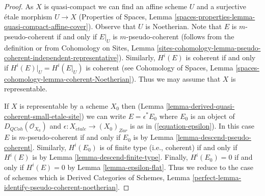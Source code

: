 \documentclass[10pt,a4paper]{amsart}
\theoremstyle{plain}
\theoremstyle{definition}
\theoremstyle{remark}
\numberwithin{equation}{subsection}
\def\etale{{\acute{e}tale}}
\def\QCoh{\mathit{QCoh}}
\begin{document}
\begin{proof}
As $X$ is quasi-compact we can find an affine scheme $U$ and a surjective
\'etale morphism $U \to X$ (Properties of Spaces, Lemma
\ref{spaces-properties-lemma-quasi-compact-affine-cover}).
Observe that $U$ is Noetherian.
Note that $E$ is $m$-pseudo-coherent if and only if $E|_U$ is
$m$-pseudo-coherent (follows from the definition or from
Cohomology on Sites, Lemma
\ref{sites-cohomology-lemma-pseudo-coherent-independent-representative}).
Similarly, $H^i(E)$ is coherent if and only if $H^i(E)|_U = H^i(E|_U)$
is coherent (see Cohomology of Spaces, Lemma
\ref{spaces-cohomology-lemma-coherent-Noetherian}).
Thus we may assume that $X$ is representable.

\medskip\noindent
If $X$ is representable by a scheme $X_0$ then
(Lemma \ref{lemma-derived-quasi-coherent-small-etale-site})
we can write $E = \epsilon^*E_0$ where $E_0$ is an object of
$D_\QCoh(\mathcal{O}_{X_0})$ and
$\epsilon : X_\etale \to (X_0)_{Zar}$ is as in
(\ref{equation-epsilon}).
In this case $E$ is $m$-pseudo-coherent
if and only if $E_0$ is by Lemma \ref{lemma-descend-pseudo-coherent}.
Similarly, $H^i(E_0)$ is of finite type (i.e., coherent) if and only if
$H^i(E)$ is by Lemma \ref{lemma-descend-finite-type}.
Finally, $H^i(E_0) = 0$ if and only if $H^i(E) = 0$ by
Lemma \ref{lemma-epsilon-flat}.
Thus we reduce to the case of schemes which is
Derived Categories of Schemes, Lemma
\ref{perfect-lemma-identify-pseudo-coherent-noetherian}.
\end{proof}
\end{document}
